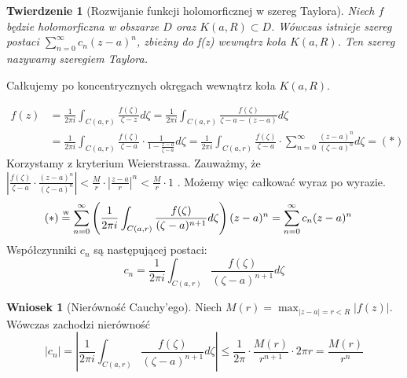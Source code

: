 \documentclass[11pt]{article}
\newcommand{\abs}[1]{\left|#1\right|} %
\newcommand{\eqtext}[1]{\overset{\text{\tiny\sffamily #1}}{=}} %
\theoremstyle{plain}
\newtheorem*{theorem}{Twierdzenie}
\theoremstyle{definition}
\newtheorem*{corollary}{Wniosek}
\theoremstyle{remark}
\let\oldendproof\endproof
\renewenvironment{proof}[1][\proofname]{
  \oldproof[\textsc{\small #1}]
}{\oldendproof}
\begin{document}
\begin{adjustbox}{valign=C,raise=0em,minipage={1.0\linewidth}}
\setlength{\columnsep}{0.5cm}
\begin{wrapfigure}{r}{3cm}
    \vspace*{-1.5em}
    \resizebox{\linewidth}{!}{}
\end{wrapfigure}
\strut{}
\vspace*{-1.9em}

\begin{theorem}[Rozwijanie funkcji holomorficznej w szereg Taylora]
  Niech $ f $ będzie holomorficzna w obszarze $ D $ oraz $ K(a, R) \subset D $. Wówczas istnieje szereg postaci $ \sum_{n = 0}^{\infty} c_{n}(z-a)^{n} $, zbieżny do f(z) wewnątrz koła $ K(a, R) $. Ten szereg nazywamy szeregiem Taylora.
\end{theorem}

\end{adjustbox}

\begin{proof}
  Całkujemy po koncentrycznych okręgach wewnątrz koła $ K(a, R) $.

  \begin{align*}
    f(z) &
    = \frac{1}{2 \pi i} \int_{C(a, r)} \frac{f(\zeta)}{\zeta-z} d\zeta
    = \frac{1}{2 \pi i} \int_{C(a, r)} \frac{f(\zeta)}{\zeta-a-(z-a)} d\zeta \\ &
    = \frac{1}{2 \pi i} \int_{C(a, r)} \frac{f(\zeta)}{\zeta-a} \cdot \frac{1}{1 - \frac{z-a}{\zeta-a}} d\zeta
    = \frac{1}{2 \pi i} \int_{C(a, r)} \frac{f(\zeta)}{\zeta-a} \cdot \sum_{n=0}^{\infty} \frac{(z-a)^{n}}{(\zeta-a)^{n}} d\zeta = (*)
  \end{align*}
  Korzystamy z kryterium Weierstrassa. Zauważmy, że
  $
    \abs{\frac{f(\zeta)}{\zeta-a} \cdot \frac{(z-a)^{n}}{(\zeta-a)^{n}}}
    < \frac{M}{r} \cdot \abs{\frac{z-a}{r}}^n
    < \frac{M}{r} \cdot 1
  $
  . Możemy więc całkować wyraz po wyrazie.
  \begin{align*}
    (*) &
    \eqtext{W} \sum_{n=0}^{\infty} \left( \frac{1}{2 \pi i} \int_{C(a, r)} \frac{f(\zeta)}{(\zeta-a)^{n+1}} d\zeta \right)(z-a)^{n}
    = \sum_{n = 0}^{\infty} c_{n}(z-a)^{n}
  \end{align*}
  Współczynniki $ c_{n} $ są następującej postaci:
  $$
    c_{n} = \frac{1}{2 \pi i} \int_{C(a, r)} \frac{f(\zeta)}{(\zeta-a)^{n+1}} d\zeta
  $$
\end{proof}

\begin{corollary}[Nierówność Cauchy'ego]
  Niech $ M(r) = \max_{\abs{z-a} = r < R} \abs{f(z)} $. Wówczas zachodzi nierówność
  $$ \abs{c_{n}} = \abs{ \frac{1}{2 \pi i} \int_{C(a, r)} \frac{f(\zeta)}{(\zeta-a)^{n+1}} d\zeta } \leq \frac{1}{2 \pi} \cdot \frac{M(r)}{r^{n+1}} \cdot 2 \pi r = \frac{M(r)}{r^n} $$
\end{corollary}
\end{document}
